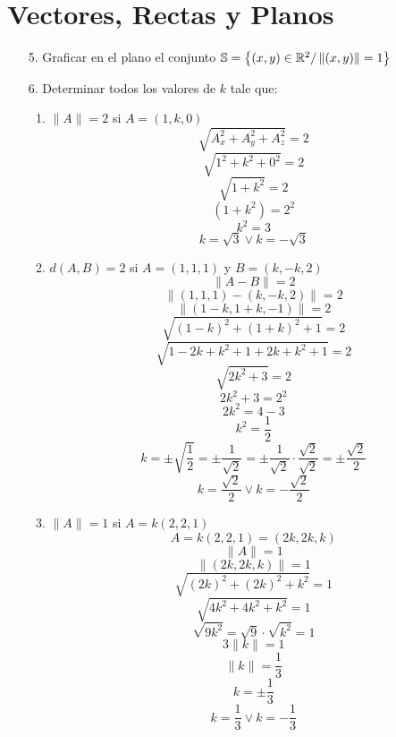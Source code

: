 \documentclass[../practica.root.tex]{subfiles}
\begin{document}
\setcounter{section}{0}
\section{Vectores, Rectas y Planos}

\begin{enumerate}
    \item[5.] Graficar en el plano el conjunto \( \mathbb{S} = \left\{ (x,y)\in\mathbb{R}^2 / \left\|(x,y)\right\| = 1 \right\} \)
    
    \item[6.] Determinar todos los valores de \(k\) tale que:
    \begin{enumerate}
        \item \( \| A \| = 2 \) si \( A = (1,k,0) \)
        \[ \sqrt{A_x^2 + A_y^2 + A_z^2} = 2 \]
        \[ \sqrt{1^2 + k^2 + 0^2} = 2 \]
        \[ \sqrt{1 + k^2} = 2 \]
        \[ (1 + k^2) = 2^2 \]
        \[ k^2 = 3 \]
        \[ k = \sqrt{3} \lor k = -\sqrt{3} \]
        \item \( d(A,B) = 2 \) si \( A = (1,1,1) \) y \( B = (k,-k,2) \)
        \[ \| A - B \| = 2 \]
        \[ \| (1,1,1) - (k,-k,2) \| = 2 \]
        \[ \| (1-k,1+k,-1) \| = 2 \]
        \[ \sqrt{(1-k)^2 + (1+k)^2 + 1} = 2 \]
        \[ \sqrt{1-2k+k^2 + 1+2k+k^2 + 1} = 2 \]
        \[ \sqrt{2k^2+3} = 2 \]
        \[ 2k^2+3 = 2^2 \]
        \[ 2k^2 = 4-3 \]
        \[ k^2 = \frac{1}{2} \]
        \[ k = \pm\sqrt{\frac{1}{2}} = \pm\frac{1}{\sqrt{2}} = \pm\frac{1}{\sqrt{2}}\cdot\frac{\sqrt{2}}{\sqrt{2}} = \pm\frac{\sqrt{2}}{2} \]
        \[ k = \frac{\sqrt{2}}{2} \lor k = -\frac{\sqrt{2}}{2} \]
        \item \( \| A \| = 1 \) si \( A = k(2,2,1) \)
        \[ A = k(2,2,1) = (2k,2k,k) \]
        \[ \| A \| = 1 \]
        \[ \| (2k,2k,k) \| = 1 \]
        \[ \sqrt{(2k)^2 + (2k)^2 + k^2} = 1 \]
        \[ \sqrt{4k^2 + 4k^2 + k^2} = 1 \]
        \[ \sqrt{9k^2} = \sqrt{9}\cdot\sqrt{k^2} = 1 \]
        \[ 3\|k\| = 1 \]
        \[ \|k\| = \frac{1}{3} \]
        \[ k = \pm\frac{1}{3} \]
        \[ k = \frac{1}{3} \lor k = -\frac{1}{3} \]

\end{enumerate}
\end{enumerate}
\end{document}

